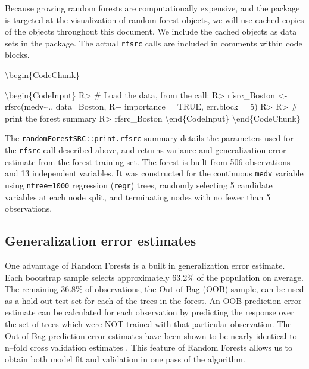 \documentclass[article]{jss}
\begin{document}
Because growing random forests are computationally expensive, and the
 package is targeted at the visualization of random
forest objects, we will use cached copies of the 
objects throughout this document. We include the cached objects as data
sets in the  package. The actual \texttt{rfsrc}
calls are included in comments within code blocks.

\textbackslash{}begin\{CodeChunk\}

\textbackslash{}begin\{CodeInput\} R\textgreater{} \# Load the data,
from the call: R\textgreater{} rfsrc\_Boston \textless{}-
rfsrc(medv\textasciitilde{}., data=Boston, R+ importance = TRUE,
err.block = 5) R\textgreater{} R\textgreater{} \# print the forest
summary R\textgreater{} rfsrc\_Boston \textbackslash{}end\{CodeInput\}
\textbackslash{}end\{CodeChunk\}

The \texttt{randomForestSRC::print.rfsrc} summary details the parameters
used for the \texttt{rfsrc} call described above, and returns variance
and generalization error estimate from the forest training set. The
forest is built from 506 observations and 13 independent variables. It
was constructed for the continuous \texttt{medv} variable using
\texttt{ntree=1000} regression (\texttt{regr}) trees, randomly selecting
5 candidate variables at each node split, and terminating nodes with no
fewer than 5 observations.

\hypertarget{generalization-error-estimates}{%
\subsection{Generalization error
estimates}\label{generalization-error-estimates}}

One advantage of Random Forests is a built in generalization error
estimate. Each bootstrap sample selects approximately 63.2\% of the
population on average. The remaining 36.8\% of observations, the
Out-of-Bag (OOB) \citep{BreimanOOB:1996e} sample, can be used as a hold
out test set for each of the trees in the forest. An OOB prediction
error estimate can be calculated for each observation by predicting the
response over the set of trees which were NOT trained with that
particular observation. The Out-of-Bag prediction error estimates have
been shown to be nearly identical to n--fold cross validation estimates
\citep{StatisticalLearning:2009}. This feature of Random Forests allows
us to obtain both model fit and validation in one pass of the algorithm.
\end{document}

